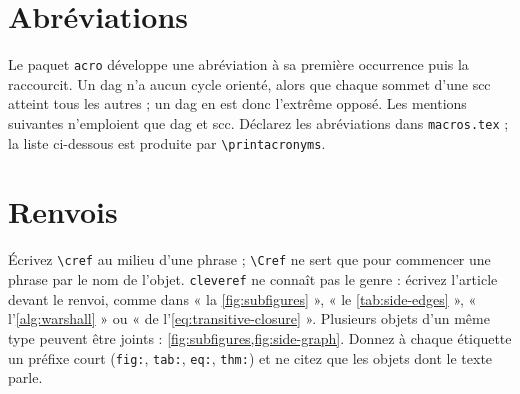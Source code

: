 \section{Abréviations}

Le paquet \texttt{acro} développe une abréviation à sa première occurrence puis la
raccourcit. Un \ac{dag} n'a aucun cycle orienté, alors que chaque sommet d'une
\ac{scc} atteint tous les autres ; un \ac{dag} en est donc l'extrême opposé. Les
mentions suivantes n'emploient que \ac{dag} et \ac{scc}. Déclarez les abréviations
dans \texttt{macros.tex} ; la liste ci-dessous est produite par
\verb|\printacronyms|.

\printacronyms[heading=none]

\section{Renvois}

Écrivez \verb|\cref| au milieu d'une phrase ; \verb|\Cref| ne sert que pour commencer
une phrase par le nom de l'objet. \texttt{cleveref} ne connaît pas le genre : écrivez l'article devant le renvoi,
comme dans « la \cref{fig:subfigures} », « le \cref{tab:side-edges} », « l'\cref{alg:warshall} »
ou « de l'\cref{eq:transitive-closure} ». Plusieurs objets d'un même type peuvent
être joints : \cref{fig:subfigures,fig:side-graph}. Donnez à chaque étiquette un
préfixe court (\texttt{fig:}, \texttt{tab:}, \texttt{eq:}, \texttt{thm:}) et ne citez
que les objets dont le texte parle.

